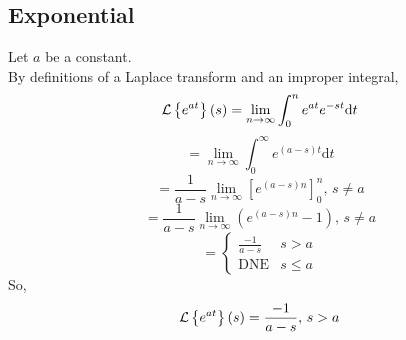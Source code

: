 \subsection{Exponential}
\noindent
Let $a$ be a constant.\\
By definitions of a Laplace transform and an improper integral,
\begin{equation*}
\mathcal{L}\left\{ e^{at} \right\}\left(s\right) = \lim\limits_{n\to\infty}{\int_{0}^{n}{e^{at}e^{-st}\mathrm{d}t}}
\end{equation*}
\begin{equation*}
 = \lim\limits_{n\to\infty}{\int_{0}^{\infty}{e^{(a-s)t} \mathrm{d}t}}
\end{equation*}
\begin{equation*}
	= \frac{1}{a-s}\lim\limits_{n\to\infty}{\left[e^{(a-s)n}\right]}_{0}^{n} \text{, } s \neq a
\end{equation*}
\begin{equation*}
	= \frac{1}{a-s}\lim\limits_{n\to\infty}{\left(e^{(a-s)n} - 1\right)} \text{, } s \neq a
\end{equation*}
\begin{equation*}
	= \begin{cases}
		\frac{-1}{a-s} & s > a \\
		\text{DNE} & s \leq a
	\end{cases}
\end{equation*}
So,
\begin{equation*}
	\mathcal{L}\left\{ e^{at} \right\}\left(s\right) = \frac{-1}{a-s} \text{, } s > a
\end{equation*}